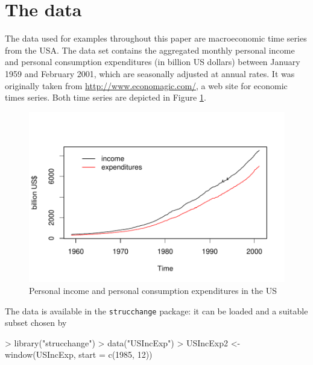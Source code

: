 \documentclass[10pt,a4paper]{article}
\begin{document}
\section{The data} \label{sec:data}
The data used for examples throughout this paper are macroeconomic time
series from the USA. The data set contains the aggregated monthly personal
income and
personal consumption expenditures (in billion US dollars) between January 1959
and February 2001, which are seasonally adjusted at annual rates.
It was originally taken from \url{http://www.economagic.com/}, a web site for
economic times series. Both time series are depicted in Figure
\ref{fig:USIncExp}.

\begin{figure}[htbp]
\begin{center}
\includegraphics{strucchange-intro-data}
\caption{\label{fig:USIncExp} Personal income and personal consumption
expenditures in the US}
\end{center}
\end{figure}

The data is
available in the {\tt strucchange} package: it can be loaded and a
suitable subset chosen by
\begin{Schunk}
\begin{Sinput}
> library("strucchange")
> data("USIncExp")
> USIncExp2 <- window(USIncExp, start = c(1985, 12))
\end{Sinput}
\end{Schunk}
\end{document}
